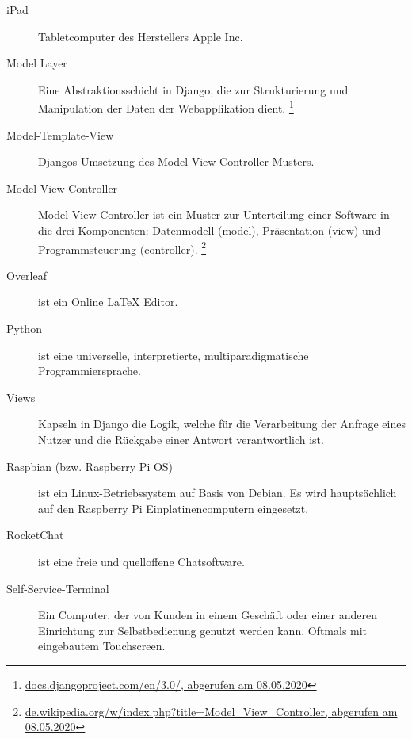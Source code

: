 \begin{description}
  \item[iPad]
    Tabletcomputer des Herstellers Apple Inc.

  \item[Model Layer]
    Eine Abstraktionsschicht in Django, die zur Strukturierung und Manipulation der Daten der Webapplikation dient.
    \footnote{\href{https://docs.djangoproject.com/en/3.0/}{docs.djangoproject.com/en/3.0/, abgerufen am 08.05.2020}}
 
  \item[Model-Template-View]
    Djangos Umsetzung des Model-View-Controller Musters.

  \item[Model-View-Controller]
    Model View Controller ist ein Muster zur Unterteilung einer Software in die drei Komponenten: Datenmodell (model), Präsentation (view) und Programmsteuerung (controller).
    \footnote{\href{https://de.wikipedia.org/w/index.php?title=Model_View_Controller&oldid=195305891}{de.wikipedia.org/w/index.php?title=Model\_View\_Controller, abgerufen am 08.05.2020}}
    
  \item[Overleaf]    
    ist ein Online LaTeX Editor. 

  \item[Python]
    ist eine universelle, interpretierte, multiparadigmatische Programmiersprache.
 
  \item[Views]
    Kapseln in Django die Logik, welche für die Verarbeitung der Anfrage eines Nutzer und die Rückgabe einer Antwort verantwortlich ist.

  \item[Raspbian (bzw. Raspberry Pi OS)]
    ist ein Linux-Betriebssystem auf Basis von Debian. Es wird hauptsächlich auf den Raspberry Pi Einplatinencomputern eingesetzt.
    
  \item[RocketChat]
    ist eine freie und quelloffene Chatsoftware.

  \item[Self-Service-Terminal]
    Ein Computer, der von Kunden in einem Geschäft oder einer anderen Einrichtung zur Selbstbedienung genutzt werden kann. Oftmals mit eingebautem Touchscreen.
\end{description}
